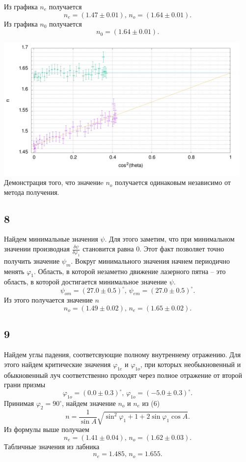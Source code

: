 Из графика $n_e$ получается
\[n_e = (1.47\pm0.01),\,n_o = (1.64\pm0.01).\]
Из графика $n_0$ получается
\[n_0 = (1.64\pm0.01).\]

\begin{center}
\includegraphics[width=0.95\textwidth]{down_up_1.png}
Демонстрация того, что значениe $n_o$ получается одинаковым независимо от метода получения.
\end{center}

\subsection*{8}
Найдем минимальные значения $\psi$. Для этого заметим, что при минимальном значении производная $\frac{\delta \psi}{\delta \varphi_1}$ становится равна $0$. Этот факт позволяет точно получить значение $\psi_m$. Вокруг минимального значения начнем периодично менять $\varphi_1$. Область, в которой незаметно движение лазерного пятна -- это область, в которой достигается минимальное значение $\psi$.
\[\psi_{om} = (27.0\pm0.5)^\circ,\,\psi_{em} = (27.0\pm0.5)^\circ.\]
Из этого получается значение $n$
\[n_o = (1.49\pm0.02),\,n_e = (1.65\pm0.02).\]
\subsection*{9}
Найдем углы падения, соответсвующие полному внутреннему отражению. Для этого найдем критические значения $\varphi_{1e}$ и $\varphi_{1o}$, при которых необыкновенный и обыкновенный луч соответственно проходят через полное отражение от второй грани призмы
\[\varphi_{1o} = (0.0\pm0.3)^\circ,\,\varphi_{1o} = (-5.0\pm0.3)^\circ.\]
Принимая $\varphi_2=90^\circ$, найдем значение $n_o$ и $n_e$ из (6)
\[n = \frac{1}{\sin A}\sqrt{\sin^2\varphi_1 + 1 + 2 \sin\varphi_1\cos A}.\]
Из формулы выше получаем
\[n_e = (1.41\pm0.04),\,n_o = (1.62\pm0.03).\]
Табличные значения из лабника
\[n_e = 1.485,\,n_o = 1.655.\]

